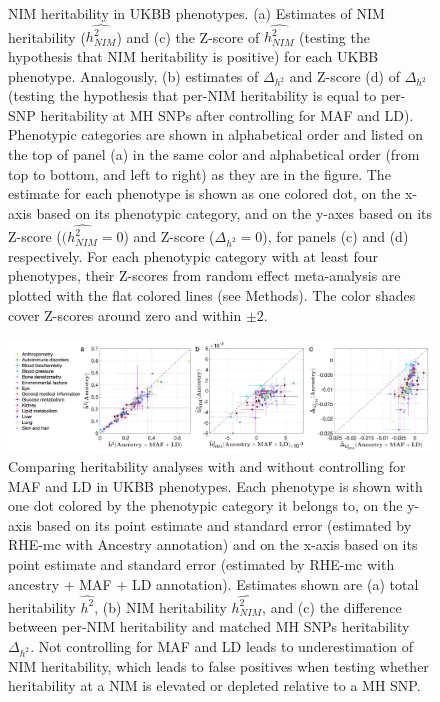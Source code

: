 \begin{figure} 
\caption[]{NIM heritability in UKBB phenotypes. (a) Estimates of NIM heritability ($\hat{h^2_{NIM}}$) and (c) the Z-score of $\hat{h^2_{NIM}}$ (testing the hypothesis that NIM heritability is positive) for each UKBB phenotype. Analogously, (b) estimates of  $\Delta_{h^2}$ and Z-score (d) of $\Delta_{h^2}$ (testing the hypothesis that per-NIM heritability is equal to per-SNP heritability at MH SNPs after controlling for MAF and LD).  Phenotypic categories are shown in alphabetical order and listed on the top of panel (a) in the same color and alphabetical order (from top to bottom, and left to right) as they are in the figure. The estimate for each phenotype is shown as one colored dot, on the x-axis based on its phenotypic category, and on the y-axes based on its Z-score ($(\hat{h^2_{NIM}}=0$) and Z-score ($\Delta_{h^2}=0$), for panels (c) and (d) respectively. For each phenotypic category with at least four phenotypes, their Z-scores from random effect meta-analysis are plotted with the flat colored lines (see Methods). The color shades cover Z-scores around zero and within $\pm2$.}
\end{figure}
\clearpage
\begin{figure}[!htb]
    \centering
    \includegraphics[width=\textwidth]{chapter3/figures/fig3.4.png}
    \caption{Comparing heritability analyses with and without controlling for MAF and LD in UKBB phenotypes. Each phenotype is shown with one dot colored by the phenotypic category it belongs to, on the y-axis based on its point estimate and standard error (estimated by RHE-mc with Ancestry annotation) and on the x-axis based on its point estimate and standard error (estimated by RHE-mc with ancestry + MAF + LD annotation). Estimates shown are (a) total heritability $\hat{h^2}$, (b) NIM heritability $\hat{h^2_{NIM}}$, and (c) the difference between per-NIM heritability and matched MH SNPs heritability $\Delta_{h^2}$. Not controlling for MAF and LD leads to underestimation of NIM heritability, which leads to false positives when testing whether heritability at a NIM is elevated or depleted relative to a MH SNP.}
    \label{fig:3.4}
\end{figure}

